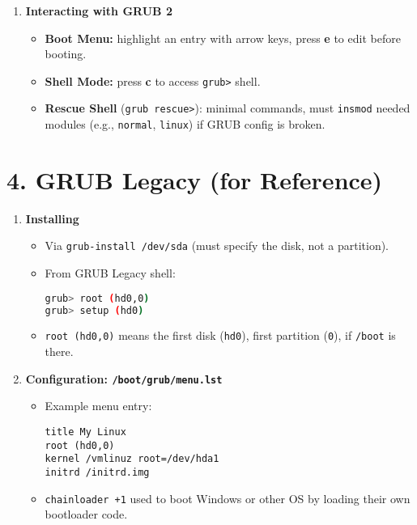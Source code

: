 \documentclass[12pt,a4paper]{report}
\begin{document}
\begin{enumerate}
    \item \textbf{Interacting with GRUB 2}
    \begin{itemize}
        \item \textbf{Boot Menu:} highlight an entry with arrow keys, press \textbf{e} to edit before booting.
        \item \textbf{Shell Mode:} press \textbf{c} to access \texttt{grub>} shell.
        \item \textbf{Rescue Shell} (\texttt{grub rescue>}): minimal commands, must \texttt{insmod} needed modules (e.g., \texttt{normal}, \texttt{linux}) if GRUB config is broken.
    \end{itemize}
\end{enumerate}

\section*{4. GRUB Legacy (for Reference)}

\begin{enumerate}
    \item \textbf{Installing}
    \begin{itemize}
        \item Via \texttt{grub-install /dev/sda} (must specify the disk, not a partition).
        \item From GRUB Legacy shell:
        \begin{lstlisting}[language=bash]
grub> root (hd0,0)
grub> setup (hd0)
        \end{lstlisting}
        \item \texttt{root (hd0,0)} means the first disk (\texttt{hd0}), first partition (\texttt{0}), if \texttt{/boot} is there.
    \end{itemize}

    \item \textbf{Configuration: \texttt{/boot/grub/menu.lst}}
    \begin{itemize}
        \item Example menu entry:
        \begin{lstlisting}
title My Linux
root (hd0,0)
kernel /vmlinuz root=/dev/hda1
initrd /initrd.img
        \end{lstlisting}
        \item \texttt{chainloader +1} used to boot Windows or other OS by loading their own bootloader code.
    \end{itemize}
\end{enumerate}
\end{document}
